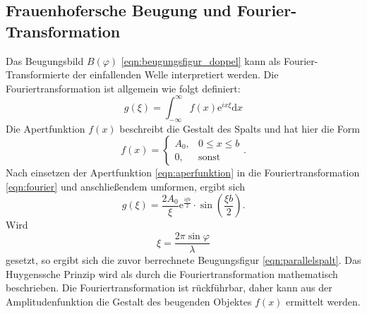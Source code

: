 \subsection{Frauenhofersche Beugung und Fourier-Transformation}
Das Beugungsbild $B(\varphi)$ \eqref{eqn:beugungsfigur_doppel} kann als Fourier-Transformierte der einfallenden Welle interpretiert werden.
Die Fouriertransformation ist allgemein wie folgt definiert:
\begin{equation}
    g(\xi) = \int_{-\infty}^\infty f(x) \mathrm{e}^{i x \xi} \mathrm{d}x
    \label{eqn:fourier}
\end{equation}
Die Apertfunktion $f(x)$ beschreibt die Gestalt des Spalts und hat hier die Form
\begin{equation}
    f(x) = \left \{ \begin{array}{ll} A_0, & 0 \leq x \leq b \\
    0, & \text{sonst}\end{array} \right. .
    \label{eqn:aperfunktion}
\end{equation}
Nach einsetzen der Apertfunktion \eqref{eqn:aperfunktion} in die Fouriertransformation \eqref{eqn:fourier} und anschließendem umformen, ergibt sich
\begin{equation}
    g(\xi) = \frac{2 A_0}{\xi} \mathrm{e}^\frac{i \xi b}{2} \cdot \sin \left( \frac{\xi b}{2} \right) .
    \label{eqn:fourier_erg}
\end{equation}
Wird 
\begin{equation*}
    \xi = \frac{2\pi \sin \varphi}{\lambda}
\end{equation*}
gesetzt, so ergibt sich die zuvor berrechnete Beugungsfigur \eqref{eqn:parallelspalt}.
Das Huygenssche Prinzip wird als durch die Fouriertransformation mathematisch beschrieben.
Die Fouriertransformation ist rückführbar, daher kann aus der Amplitudenfunktion die Gestalt des beugenden Objektes $f(x)$ ermittelt werden.